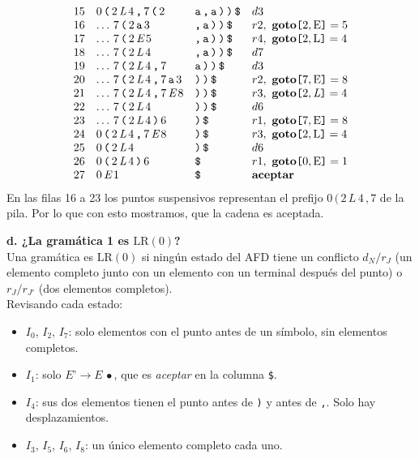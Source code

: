 \documentclass[12pt,letterpaper]{article}
\newcommand{\nt}[1]{\textit{#1}}
\newcommand{\tk}[1]{\texttt{#1}}
\newcommand{\tx}[1]{\text{#1}}
\newcommand{\lrc}{\mathrm{LR(0)}}
\begin{document}
\begin{enumerate}[label=\arabic*.]
{\[\begin{array}{r l l l}
    15 & 0\,\tk{(}\,2\,\nt{L}\,4\,\tk{,}\,7\,\tk{(}\,2 & \tk{a\,,\,a\,)\,)\,\$} & d3 \\
    16 & \ldots\,7\,\tk{(}\,2\,\tk{a}\,3 & \tk{,\,a\,)\,)\,\$} & r2,\ \textbf{goto}\tk{[}2,\tx{E}\tk{]}=5 \\
    17 & \ldots\,7\,\tk{(}\,2\,\nt{E}\,5 & \tk{,\,a\,)\,)\,\$} & r4,\ \textbf{goto}\tk{[}2,\tx{L}\tk{]}=4 \\
    18 & \ldots\,7\,\tk{(}\,2\,\nt{L}\,4 & \tk{,\,a\,)\,)\,\$} & d7 \\
    19 & \ldots\,7\,\tk{(}\,2\,\nt{L}\,4\,\tk{,}\,7 & \tk{a\,)\,)\,\$} & d3 \\
    20 & \ldots\,7\,\tk{(}\,2\,\nt{L}\,4\,\tk{,}\,7\,\tk{a}\,3 & \tk{)\,)\,\$} & r2,\ \textbf{goto}\tk{[}7,\tx{E}\tk{]}=8 \\
    21 & \ldots\,7\,\tk{(}\,2\,\nt{L}\,4\,\tk{,}\,7\,\nt{E}\,8 & \tk{)\,)\,\$} & r3,\ \textbf{goto}\tk{[}2,\nt{L}\tk{]}=4 \\
    22 & \ldots\,7\,\tk{(}\,2\,\nt{L}\,4 & \tk{)\,)\,\$} & d6 \\
    23 & \ldots\,7\,\tk{(}\,2\,\nt{L}\,4\,\tk{)}\,6 & \tk{)\,\$} & r1,\ \textbf{goto}\tk{[}7,\tx{E}\tk{]}=8 \\
    24 & 0\,\tk{(}\,2\,\nt{L}\,4\,\tk{,}\,7\,\nt{E}\,8 & \tk{)\,\$} & r3,\ \textbf{goto}\tk{[}2,\tx{L}\tk{]}=4 \\
    25 & 0\,\tk{(}\,2\,\nt{L}\,4 & \tk{)\,\$} & d6 \\
    26 & 0\,\tk{(}\,2\,\nt{L}\,4\,\tk{)}\,6 & \tk{\$} & r1,\ \textbf{goto}\tk{[}0,\tx{E}\tk{]}=1 \\
    27 & 0\,\nt{E}\,1 & \tk{\$} & \textbf{aceptar}
  \end{array}
  \]
  }
  En las filas 16 a 23 los puntos suspensivos representan el prefijo $0\,\tk{(}\,2\,\nt{L}\,4\,\tk{,}\,7$
  de la pila. Por lo que con esto mostramos, que la cadena es aceptada.

  \bigskip

  \textbf{\large d. ¿La gramática 1 es $\lrc$?}\\

  Una gramática es $\lrc$ si ningún estado del AFD tiene un conflicto $d_N/r_J$ (un elemento completo junto con
  un elemento con un terminal después del punto) o $r_J/r_{J'}$ (dos elementos completos).\\
  Revisando cada estado:
  \begin{itemize}
  \item $I_0$, $I_2$, $I_7$: solo elementos con el punto antes de un símbolo, sin elementos completos.
  \item $I_1$: solo $\nt{E'}\to\nt{E}\,\bullet$, que es \textit{aceptar} en la columna \tk{\$}.
  \item $I_4$: sus dos elementos tienen el punto antes de \tk{)} y antes de \tk{,}. Solo hay desplazamientos.
  \item $I_3$, $I_5$, $I_6$, $I_8$: un único elemento completo cada uno.
  \end{itemize}
  

\end{enumerate}
\end{document}
